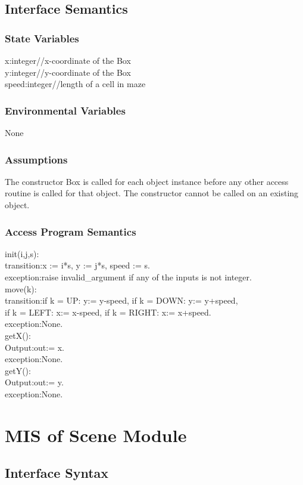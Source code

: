 \documentclass[12pt, titlepage]{article}
\begin{document}
\subsection{Interface Semantics}
\subsubsection{State Variables}
x:integer//x-coordinate of the Box\\
y:integer//y-coordinate of the Box\\
speed:integer//length of a cell in maze
\subsubsection{Environmental Variables}
None
\subsubsection{Assumptions}
The constructor Box is called for each object instance before any other
access routine is called for that object.  The constructor cannot be called on
an existing object.

\subsubsection{Access Program Semantics}
init(i,j,s):\\
transition:x := i*s, y := j*s, speed := s.\\
exception:raise invalid\_argument if any of the inputs is not integer.\\
move(k):\\
transition:if k = UP: y:= y-speed, if k = DOWN: y:= y+speed,\\
if k = LEFT: x:= x-speed, if k = RIGHT: x:= x+speed.\\
exception:None.\\
getX():\\
Output:out:= x.\\
exception:None.\\
getY():\\
Output:out:= y.\\
exception:None.



\section{MIS of Scene Module}
\subsection{Interface Syntax}
\end{document}
